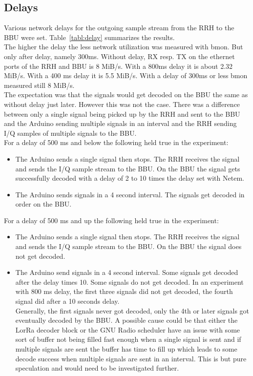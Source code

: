 \subsection{Delays}
Various network delays for the outgoing sample stream from the RRH to the BBU were set.
Table~\ref{tabl:delay} summarizes the results.
\\
The higher the delay the less network utilization was measured with bmon. But only after delay,
namely 300ms. Without delay, RX resp. TX on the ethernet ports of the RRH and BBU is 8 MiB/s.
With a 800ms delay it is about 2.32 MiB/s. With a 400 ms delay it is 5.5 MiB/s. With a delay 
of 300ms or less bmon measured still 8 MiB/s.
\\
The expectation was that the signals would get decoded on the BBU the same as without delay just later.
However this was not the case. There was a difference between only a single signal being picked up by the RRH and sent 
to the BBU and the Arduino sending multiple signals in an interval and the RRH sending I/Q samples of multiple signals 
to the BBU.
\\
For a delay of 500 ms and below the following held true in the experiment:
\\
\begin{itemize}
    \item The Arduino sends a single signal then stops. The RRH receives the signal and sends the I/Q sample stream
    to the BBU. On the BBU the signal gets successfully decoded with a delay of 2 to 10 times the delay set with Netem.
    \item The Arduino sends signals in a 4 second interval. The signals get decoded in order on the BBU.
\end{itemize}


For a delay of 500 ms and up the following held true in the experiment:
\\
\begin{itemize}
    \item The Arduino sends a single signal then stops. The RRH receives the signal and sends the I/Q sample stream 
    to the BBU. On the BBU the signal does not get decoded.
    \item The Arduino send signals in a 4 second interval. Some signals get decoded after the delay times 10. Some signals do not get decoded.
    In an experiment with 800 ms delay, the first three signals did not get decoded, the fourth signal did after a 10 seconds delay. \\
    Generally, the first signals never got decoded, only the 4th or later signals got eventually decoded by the BBU.
    A possible cause could be that either the LorRa decoder block or the GNU Radio scheduler have an issue 
    with some sort of buffer not being filled fast enough when a single signal is sent and if multiple signals are sent 
    the buffer has time to fill up which leads to some decode success when multiple signals are sent in an interval.
    This is but pure speculation and would need to be investigated further.

\end{itemize}


